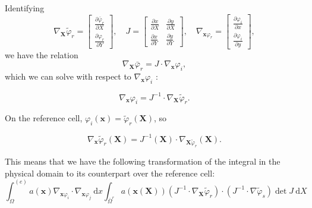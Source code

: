 \documentclass[../main.tex]{subfiles}
\begin{document}
		Identifying
		$$
		\nabla_{\boldsymbol{X}} \tilde{\varphi}_{r}=\left[\begin{array}{l}
			\frac{\partial \bar{\varphi}_{r}}{\partial X} \\
			\frac{\partial \varphi_{r}}{\partial Y}
		\end{array}\right], \quad J=\left[\begin{array}{ll}
			\frac{\partial x}{\partial X} & \frac{\partial y}{\partial X} \\
			\frac{\partial x}{\partial Y} & \frac{\partial y}{\partial Y}
		\end{array}\right], \quad \nabla_{\boldsymbol{x} \varphi_{r}}=\left[\begin{array}{c}
			\frac{\partial \varphi_{i}}{\partial x} \\
			\frac{\partial \varphi_{i}}{\partial y}
		\end{array}\right],
		$$
		we have the relation
		$$
		\nabla_{\boldsymbol{X}} \bar{\varphi}_{r}=J \cdot \nabla_{\boldsymbol{x}} \varphi_{i},
		$$
		which we can solve with respect to $\nabla_{\boldsymbol{x}} \varphi_{i}$ :
		
		\begin{equation}
			\label{eqa202}
			\nabla_{\boldsymbol{x}} \varphi_{i}=J^{-1} \cdot \nabla_{\boldsymbol{X}} 	\tilde{\varphi}_{r} .
		\end{equation}
	
		\noindent On the reference cell, $\varphi_{i}(\boldsymbol{x})=\tilde{\varphi}_{r}(\boldsymbol{X})$, so
		
		\begin{equation}
			\label{eqa203}
			\nabla_{\boldsymbol{x}} \tilde{\varphi}_{r}(\boldsymbol{X})=J^{-1}(\boldsymbol{X}) \cdot \nabla_{\boldsymbol{X} \tilde{\varphi}_{r}}(\boldsymbol{X}) .
		\end{equation}
	
		This means that we have the following transformation of the integral in the physical domain to its counterpart over the reference cell:
		\begin{equation}
			\label{eqa204}
			\int_{\Omega}^{(e)} a(\boldsymbol{x}) \nabla_{\boldsymbol{x} \varphi_{i}} \cdot 	\nabla_{\boldsymbol{x} \varphi_{j}} \mathrm{~d} x \int_{\bar{\Omega}^{r}} a(\boldsymbol{x}(\boldsymbol{X}))\left(J^{-1} \cdot \nabla_{\boldsymbol{X}} \tilde{\varphi}_{r}\right) \cdot\left(J^{-1} \cdot \nabla \tilde{\varphi}_{s}\right) \operatorname{det} J \mathrm{~d} X
		\end{equation}\bigbreak
	
\end{document}
